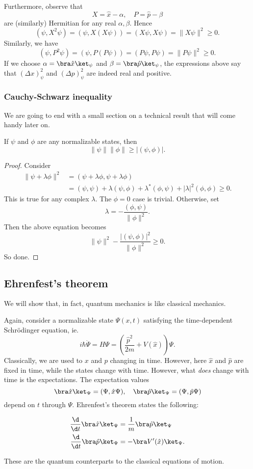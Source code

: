 \documentclass[a4paper]{article}
\begin{document}
Furthermore, observe that
\[
  X = \hat{x} - \alpha,\quad P = \hat{p} - \beta
\]
are (similarly) Hermitian for any real $\alpha, \beta$. Hence
\[
  (\psi, X^2 \psi) = (\psi, X(X\psi)) = (X\psi, X\psi) = \|X\psi\|^2 \geq 0.
\]
Similarly, we have
\[
  (\psi, P^2 \psi) = (\psi, P(P\psi)) = (P\psi, P\psi) = \|P\psi\|^2 \geq 0.
\]
If we choose $\alpha = \bra \hat{x}\ket_\psi$ and $\beta = \bra \hat{p}\ket_\psi$, the expressions above say that $(\Delta x)^2_\psi$ and $(\Delta p)^2_\psi$ are indeed real and positive.
\subsubsection*{Cauchy-Schwarz inequality}
We are going to end with a small section on a technical result that will come handy later on.
\begin{prop}
  If $\psi$ and $\phi$ are any normalizable states, then
  \[
    \|\psi\|\|\phi\| \geq |(\psi, \phi)|.
  \]
\end{prop}

\begin{proof}
  Consider
  \begin{align*}
    \|\psi + \lambda \phi\|^2 &= (\psi + \lambda \phi, \psi + \lambda \phi) \\
    &= (\psi, \psi) + \lambda(\psi, \phi) + \lambda^*(\phi, \psi) + |\lambda|^2 (\phi, \phi) \geq 0.
  \end{align*}
  This is true for any complex $\lambda$. The $\phi = 0$ case is trivial. Otherwise, set
  \[
    \lambda = -\frac{(\phi, \psi)}{\|\phi\|^2}.
  \]
  Then the above equation becomes
  \[
    \|\psi\|^2 - \frac{|(\psi, \phi)|^2}{\|\phi\|^2} \geq 0.
  \]
  So done.
\end{proof}
\subsection{Ehrenfest's theorem}
We will show that, in fact, quantum mechanics is like classical mechanics.

Again, consider a normalizable state $\Psi(x, t)$ satisfying the time-dependent Schr\"odinger equation, ie.
\[
  i\hbar \dot{\Psi} = H\Psi = \left(\frac{\hat{p}^2}{2m} + V(\hat{x})\right) \Psi.
\]
Classically, we are used to $x$ and $p$ changing in time. However, here $\hat{x}$ and $\hat{p}$ are fixed in time, while the states change with time. However, what \emph{does} change with time is the expectations. The expectation values
\[
  \bra \hat{x}\ket_\Psi = (\Psi, \hat{x}\Psi),\quad \bra \hat{p}\ket_\Psi = (\Psi, \hat{p}\Psi)
\]
depend on $t$ through $\Psi$. Ehrenfest's theorem states the following:
\begin{thm}
  \begin{align*}
    \frac{\d}{\d t}\bra \hat{x}\ket_\Psi &= \frac{1}{m}\bra \hat{p}\ket_\Psi\\
    \frac{\d}{\d t}\bra \hat{p}\ket_\Psi &= -\bra V'(\hat{x})\ket_\Psi.
  \end{align*}
\end{thm}
These are the quantum counterparts to the classical equations of motion.
\end{document}

